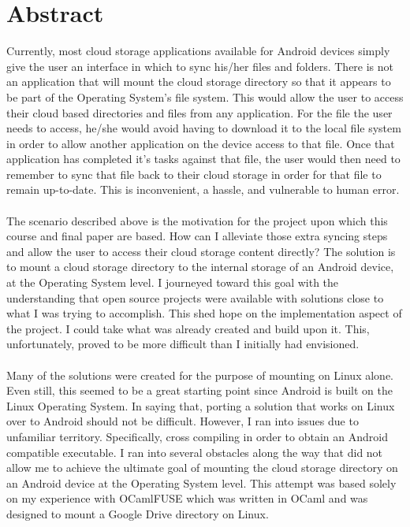 \chapter{Abstract}
Currently, most cloud storage applications available for Android devices simply give the user an interface in which to sync his/her files and folders. There is not an application that will mount the cloud storage directory so that it appears to be part of the Operating System's file system. This would allow the user to access their cloud based directories and files from any application. For the file the user needs to access, he/she would avoid having to download it to the local file system in order to allow another application on the device access to that file. Once that application has completed it's tasks against that file, the user would then need to remember to sync that file back to their cloud storage in order for that file to remain up-to-date. This is inconvenient, a hassle, and vulnerable to human error. \\ \\
The scenario described above is the motivation for the project upon which this course and final paper are based. How can I alleviate those extra syncing steps and allow the user to access their cloud storage content directly? The solution is to mount a cloud storage directory to the internal storage of an Android device, at the Operating System level. I journeyed toward this goal with the understanding that open source projects were available with solutions close to what I was trying to accomplish. This shed hope on the implementation aspect of the project. I could take what was already created and build upon it. This, unfortunately, proved to be more difficult than I initially had envisioned. \\ \\
Many of the solutions were created for the purpose of mounting on Linux alone. Even still, this seemed to be a great starting point since Android is built on the Linux Operating System. In saying that, porting a solution that works on Linux over to Android should not be difficult. However, I ran into issues due to unfamiliar territory. Specifically, cross compiling in order to obtain an Android compatible executable. I ran into several obstacles along the way that did not allow me to achieve the ultimate goal of mounting the cloud storage directory on an Android device at the Operating System level. This attempt was based solely on my experience with OCamlFUSE which was written in OCaml and was designed to mount a Google Drive directory on Linux. \\ \\ 
